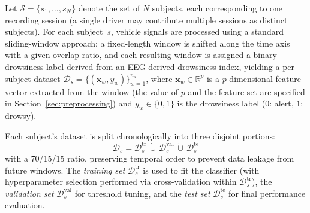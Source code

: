 \documentclass[lettersize,journal]{IEEEtran}
\begin{document}
Let $\mathcal{S} = \{s_1, \ldots, s_N\}$ denote the set of $N$ subjects, each corresponding to one recording session (a single driver may contribute multiple sessions as distinct subjects).
For each subject~$s$, vehicle signals are processed using a standard sliding-window approach: a fixed-length window is shifted along the time axis with a given overlap ratio, and each resulting window is assigned a binary drowsiness label derived from an EEG-derived drowsiness index, yielding a per-subject dataset $\mathcal{D}_s = \{(\mathbf{x}_w, y_w)\}_{w=1}^{n_s}$, where $\mathbf{x}_w \in \mathbb{R}^p$ is a $p$-dimensional feature vector extracted from the window (the value of $p$ and the feature set are specified in Section~\ref{sec:preprocessing}) and $y_w \in \{0, 1\}$ is the drowsiness label ($0$: alert, $1$: drowsy).

Each subject's dataset is split chronologically into three disjoint portions:
\begin{equation}
\label{eq:split}
\mathcal{D}_s = \mathcal{D}_s^{\mathrm{tr}} \,\dot{\cup}\, \mathcal{D}_s^{\mathrm{val}} \,\dot{\cup}\, \mathcal{D}_s^{\mathrm{te}}
\end{equation}
with a 70/15/15 ratio, preserving temporal order to prevent data leakage from future windows.
The \emph{training set} $\mathcal{D}_s^{\mathrm{tr}}$ is used to fit the classifier (with hyperparameter selection performed via cross-validation within $\mathcal{D}_s^{\mathrm{tr}}$), the \emph{validation set} $\mathcal{D}_s^{\mathrm{val}}$ for threshold tuning, and the \emph{test set} $\mathcal{D}_s^{\mathrm{te}}$ for final performance evaluation.
\end{document}
